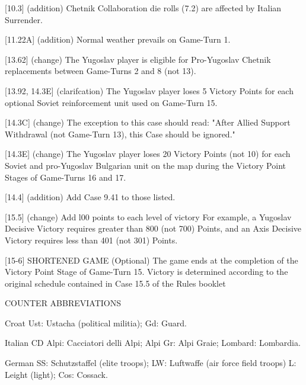 [10.3] (addition) Chetnik Collaboration die rolls (7.2) are
affected by Italian Surrender.

[11.22A] (addition) Normal weather prevails on Game-Turn 1.

[13.62] (change) The Yugoslav player is eligible for
Pro-Yugoslav Chetnik replacements between Game-Turns 2 and 8 (not
13).

[13.92, 14.3E] (clarifcation) The Yugoslav player loses 5 Victory
Points for each optional Soviet reinforcement unit used on
Game-Turn 15.

[14.3C] (change) The exception to this case should read: "After
Allied Support Withdrawal (not Game-Turn 13), this Case should be
ignored."

[14.3E] (change) The Yugoslav player loses 20 Victory Points (not 10)
for each Soviet and pro-Yugoslav Bulgarian unit on the map during the
Victory Point Stages of Game-Turns 16 and 17.

[14.4] (addition) Add Case 9.41 to those listed.

[15.5] (change) Add l00 points to each level of victory For example,
a Yugoslav Decisive Victory requires greater than 800 (not 700) Points,
and an Axis Decisive Victory requires less than 401 (not 301)
Points.

[15-6] SHORTENED GAME (Optional)
The game ends at the completion of the Victory Point Stage of
Game-Turn 15. Victory is determined according to the original schedule
contained in Case 15.5 of the Rules booklet

COUNTER ABBREVIATIONS

Croat
Ust: Ustacha (political militia); Gd: Guard.

Italian
CD Alpi: Cacciatori delli Alpi; Alpi Gr: Alpi Graie; Lombard: Lombardia.

German
SS: Schutzstaffel (elite troops); LW: Luftwaffe (air force field troops)
L: Leight (light); Cos: Cossack.

